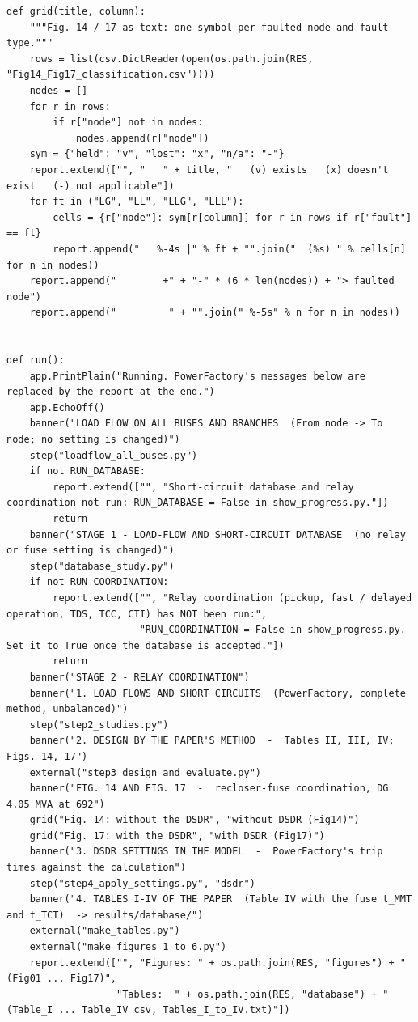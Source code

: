 \documentclass[12pt,a4paper]{article}
\begin{document}
\begin{lstlisting}
def grid(title, column):
    """Fig. 14 / 17 as text: one symbol per faulted node and fault type."""
    rows = list(csv.DictReader(open(os.path.join(RES, "Fig14_Fig17_classification.csv"))))
    nodes = []
    for r in rows:
        if r["node"] not in nodes:
            nodes.append(r["node"])
    sym = {"held": "v", "lost": "x", "n/a": "-"}
    report.extend(["", "   " + title, "   (v) exists   (x) doesn't exist   (-) not applicable"])
    for ft in ("LG", "LL", "LLG", "LLL"):
        cells = {r["node"]: sym[r[column]] for r in rows if r["fault"] == ft}
        report.append("   %-4s |" % ft + "".join("  (%s) " % cells[n] for n in nodes))
    report.append("        +" + "-" * (6 * len(nodes)) + "> faulted node")
    report.append("         " + "".join(" %-5s" % n for n in nodes))


def run():
    app.PrintPlain("Running. PowerFactory's messages below are replaced by the report at the end.")
    app.EchoOff()
    banner("LOAD FLOW ON ALL BUSES AND BRANCHES  (From node -> To node; no setting is changed)")
    step("loadflow_all_buses.py")
    if not RUN_DATABASE:
        report.extend(["", "Short-circuit database and relay coordination not run: RUN_DATABASE = False in show_progress.py."])
        return
    banner("STAGE 1 - LOAD-FLOW AND SHORT-CIRCUIT DATABASE  (no relay or fuse setting is changed)")
    step("database_study.py")
    if not RUN_COORDINATION:
        report.extend(["", "Relay coordination (pickup, fast / delayed operation, TDS, TCC, CTI) has NOT been run:",
                       "RUN_COORDINATION = False in show_progress.py. Set it to True once the database is accepted."])
        return
    banner("STAGE 2 - RELAY COORDINATION")
    banner("1. LOAD FLOWS AND SHORT CIRCUITS  (PowerFactory, complete method, unbalanced)")
    step("step2_studies.py")
    banner("2. DESIGN BY THE PAPER'S METHOD  -  Tables II, III, IV; Figs. 14, 17")
    external("step3_design_and_evaluate.py")
    banner("FIG. 14 AND FIG. 17  -  recloser-fuse coordination, DG 4.05 MVA at 692")
    grid("Fig. 14: without the DSDR", "without DSDR (Fig14)")
    grid("Fig. 17: with the DSDR", "with DSDR (Fig17)")
    banner("3. DSDR SETTINGS IN THE MODEL  -  PowerFactory's trip times against the calculation")
    step("step4_apply_settings.py", "dsdr")
    banner("4. TABLES I-IV OF THE PAPER  (Table IV with the fuse t_MMT and t_TCT)  -> results/database/")
    external("make_tables.py")
    external("make_figures_1_to_6.py")
    report.extend(["", "Figures: " + os.path.join(RES, "figures") + "  (Fig01 ... Fig17)",
                   "Tables:  " + os.path.join(RES, "database") + "  (Table_I ... Table_IV csv, Tables_I_to_IV.txt)"])



\end{lstlisting}
\end{document}
